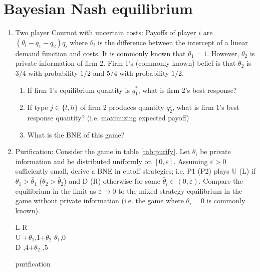 \documentclass[a4paper,12pt]{article}
\begin{document}
\section{Bayesian Nash equilibrium}
\label{sec:Bayes-nash-eq}
\begin{enumerate}
\item Two player Cournot with uncertain costs: Payoffs of player $i$ are $(\theta _i-q_1-q_2)q_i$ where $\theta _i$ is the difference between the intercept of a linear demand function and costs. It is commonly known that $\theta _1=1$. However, $\theta _2$ is private information of firm 2. Firm 1's (commonly known) belief is that $\theta _2$ is $3/4$ with probability $1/2$ and $5/4$ with probability $1/2$.
  \begin{enumerate}
  \item If firm 1's equilibrium quantity is $q_1^*$, what is firm 2's best response?
  \item If type $j\in\{l,h\}$ of firm 2 produces quantity $q_2^j$, what is firm 1's best response quantity? (i.e. maximizing expected payoff)
    \item What is the BNE of this game?
  \end{enumerate}
\item Purification: Consider the game in table \ref{tab:purify}. Let $\theta _i$ be private information and be distributed uniformly on $[0 ,\varepsilon ]$. Assuming $\varepsilon >0$ sufficiently small, derive a BNE in cutoff strategies; i.e. P1 (P2) plays U (L) if $\theta _1>\bar{\theta }_1$ ($\theta _2>\bar{\theta }_2$) and D (R) otherwise for some $\bar \theta_i\in(0,\bar{\varepsilon })$. Compare the equilibrium in the limit as $\varepsilon \rightarrow 0$ to the mixed strategy equilibrium in the game without private information (i.e. the game where $\theta _i=0$ is commonly known). 
     \begin{table}[h]
\centering
 \begin{game}{2}{2}
       \> L  \>R\\ %
U   $+\theta_1$,1$+\theta _2$    \> $\theta_1$,0   \\
D  ,4$+\theta _2$    ,5
\end{game}  
\caption{purification}
\label{tab:purify}
\end{table}
\end{enumerate}




\end{document}
